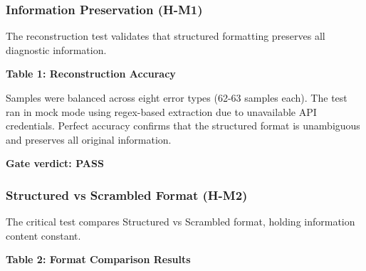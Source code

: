 
\subsubsection{Information Preservation (H-M1)}

The reconstruction test validates that structured formatting preserves all diagnostic information.

\textbf{Table 1: Reconstruction Accuracy}

\begin{table}[htbp]
\centering
{}
\end{table}

Samples were balanced across eight error types (62-63 samples each). The test ran in mock mode using regex-based extraction due to unavailable API credentials. Perfect accuracy confirms that the structured format is unambiguous and preserves all original information.

\textbf{Gate verdict: PASS}

\subsubsection{Structured vs Scrambled Format (H-M2)}

The critical test compares Structured vs Scrambled format, holding information content constant.

\textbf{Table 2: Format Comparison Results}

\begin{table}[htbp]
\centering
{}
\end{table}

